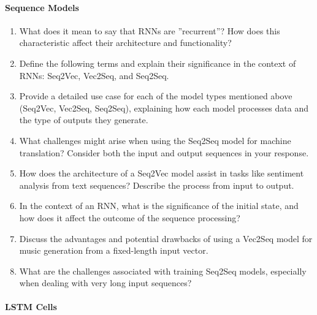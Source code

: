 \paragraph*{Sequence Models}

\begin{enumerate}
	\item What does it mean to say that RNNs are ''recurrent''? How does this characteristic affect their architecture and functionality?
	\item Define the following terms and explain their significance in the context of RNNs: Seq2Vec, Vec2Seq, and Seq2Seq.
	\item Provide a detailed use case for each of the model types mentioned above (Seq2Vec, Vec2Seq, Seq2Seq), explaining how each model processes data and the type of outputs they generate.
	\item What challenges might arise when using the Seq2Seq model for machine translation? Consider both the input and output sequences in your response.
	\item How does the architecture of a Seq2Vec model assist in tasks like sentiment analysis from text sequences? Describe the process from input to output.
	\item In the context of an RNN, what is the significance of the initial state, and how does it affect the outcome of the sequence processing?
	\item Discuss the advantages and potential drawbacks of using a Vec2Seq model for music generation from a fixed-length input vector.
	\item What are the challenges associated with training Seq2Seq models, especially when dealing with very long input sequences?
\end{enumerate}

\paragraph*{LSTM Cells}

